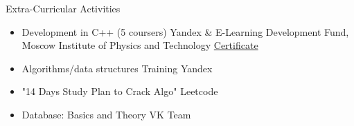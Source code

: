\documentclass{resume} %
\begin{document}
 
\begin{rSection}{Extra-Curricular Activities} 
\begin{itemize}
    \item Development in C++ (5 coursers) \hfill
    Yandex \& E-Learning Development Fund, Moscow Institute of Physics and Technology \hfill \href{https://drive.google.com/file/d/1d1d4hC7YXxu3HGqzQ9vJUY29GPHpFAra/view?usp=sharing}{Certificate} 
    \item Algorithms/data structures Training \hfill Yandex
    \item "14 Days Study Plan to Crack Algo" \hfill Leetcode
    \item Database: Basics and Theory \hfill VK Team
\end{itemize}
 
 
\end{rSection}
 
 
 
 
 
 
\end{document}
